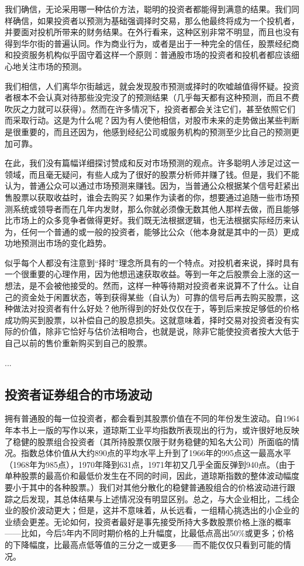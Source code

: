 \documentclass[12pt,oneside]{book}
\begin{document}
我们确信，无论采用哪一种估价方法，聪明的投资者都能得到满意的结果。我们同样确信，如果投资者以预测为基础强调择时交易，那么他最终将成为一个投机者，并要面对投机所带来的财务结果。在外行看来，这种区别非常不明显，而且也没有得到华尔街的普遍认同。作为商业行为，或者是出于一种完全的信任，股票经纪商和投资服务机构似乎固守着这样一个原则：普通股市场的投资者和投机者都应该细心地关注市场的预测。

我们相信，人们离华尔街越远，就会发现股市预测或择时的吹嘘越值得怀疑。投资者根本不会认真对待那些没完没了的预测结果（几乎每天都有这种预测，而且不费吹灰之力就可以获得）。然而在许多情况下，投资者都会关注它们，甚至依照它们而采取行动。这是为什么呢？因为有人使他相信，对股市未来的走势做出某些判断是很重要的，而且还因为，他感到经纪公司或服务机构的预测至少比自己的预测更加可靠。

在此，我们没有篇幅详细探讨赞成和反对市场预测的观点。许多聪明人涉足过这一领域，而且毫无疑问，有些人成为了很好的股票分析师并赚了钱。但是，我们不能认为，普通公众可以通过市场预测来赚钱。因为，当普通公众根据某个信号赶紧出售股票以获取收益时，谁会去购买？如果作为读者的你，想要通过追随一些市场预测系统或领导者而在几年内发财，那么你就必须像无数其他人那样去做，而且能够比市场上的众多竞争者做得更好。我们既无法根据逻辑，也无法根据实际经历来认为，任何一个普通的或一般的投资者，能够比公众（他本身就是其中的一员）更成功地预测出市场的变化趋势。

似乎每个人都没有注意到“择时”理念所具有的一个特点。对投机者来说，择时具有一个很重要的心理作用，因为他想迅速获取收益。等到一年之后股票会上涨的这一想法，是不会被他接受的。然而，这样一种等待期对投资者来说算不了什么。让自己的资金处于闲置状态，等到获得某些（自认为）可靠的信号后再去购买股票，这种做法对投资者有什么好处？他所得到的好处仅仅在于，等到后来按足够低的价格成功购买到股票，以补偿自己的股息损失。这就意味着，择时交易对投资者没有实际的价值，除非它恰好与估价法相吻合，也就是说，除非它能使投资者按大大低于自己以前的售价重新购买到自己的股票。

...



\subsection{投资者证券组合的市场波动}
拥有普通股的每一位投资者，都会看到其股票价值在不同的年份发生波动。自1964年本书上一版的写作以来，道琼斯工业平均指数所表现出的行为，或许很好地反映了稳健的股票组合投资者（其所持股票仅限于财务稳健的知名大公司）所面临的情况。指数总体价值从大约890点的平均水平上升到了1966年的995点这一最高水平（1968年为985点），1970年降到631点，1971年初又几乎全面反弹到940点。（由于单种股票的最高价和最低价发生在不同的时间，因此，道琼斯指数的整体波动幅度要小于其中的各种股票。）我们对其他分散化的稳健普通股组合的价格波动进行跟踪之后发现，其总体结果与上述情况没有明显区别。总之，与大企业相比，二线企业的股价波动更大；但是，这并不意味着，从长远看，一组精心挑选出的小企业的业绩会更差。无论如何，投资者最好是事先接受所持大多数股票价格上涨的概率——比如，今后5年内不同时期价格的上升幅度，比最低点高出50\%或更多；价格的下降幅度，比最高点低等值的三分之一或更多——而不能仅仅只看到可能的情况。
\end{document}
